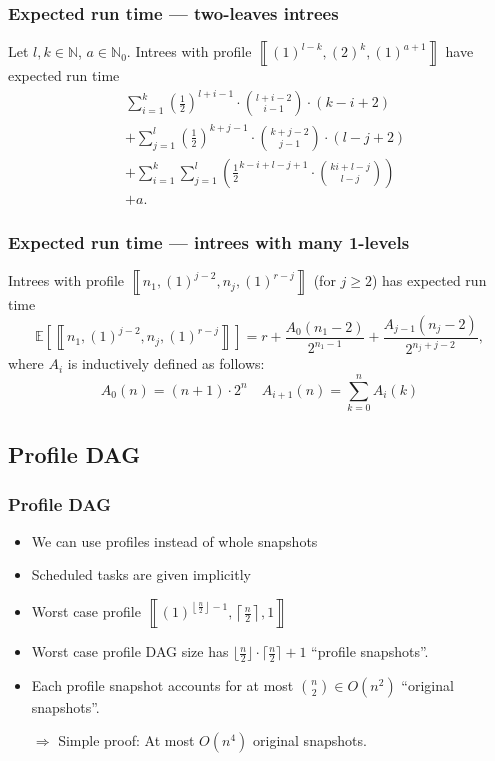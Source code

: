 \documentclass{beamer}
\newcommand{\profile}[1]{\left\llbracket #1 \right\rrbracket}
\newcommand{\profilerepeat}[2]{{(#1)}^{#2}}
\newcommand{\profileones}[1]{\profilerepeat{1}{#1}}
\newcommand{\E}[1]{\mathbb{E}\left[ #1 \right]}
\newcommand{\naturals}{\mathbb{N}}
\newcommand{\todo}[1]{ {\color{red}{#1} }}
\begin{document}
\begin{frame}
  \frametitle{Expected run time --- two-leaves intrees}
  \begin{theorem}[Moritz Maaß\todo{Wie zitieren?}]
    Let $l, k\in\naturals$, $a\in\naturals_0$. Intrees with profile $\profile{\profilerepeat{1}{l-k}, \profilerepeat{2}{k}, \profilerepeat{1}{a+1}}$ have expected run time
    \begin{align*}
      & \sum_{i=1}^k \left(\frac{1}{2}\right)^{l+i-1} \cdot \binom{l+i-2}{i-1} \cdot \left( k-i+2 \right) \\
       & + \sum_{j=1}^l \left(\frac{1}{2}\right)^{k+j-1} \cdot \binom{k+j-2}{j-1} \cdot \left( l-j+2 \right) \\
       & + \sum_{i=1}^k \sum_{j=1}^l \left( \frac{1}{2}^{k-i+l-j+1}\cdot\binom{ki+l-j}{l-j} \right) \\
       & + a
      .
    \end{align*}
  \end{theorem}
\end{frame}

\begin{frame}
  \frametitle{Expected run time --- intrees with many 1-levels}
  \begin{theorem}
    Intrees with profile $\profile{n_1,\profileones{j-2},n_j,\profileones{r-j}}$ (for $j\geq 2$) has expected run time
    \begin{equation*}
      \E{\profile{n_1,\profileones{j-2},n_j,\profileones{r-j}}} = 
      r + \frac{A_0(n_1-2)}{2^{n_1-1}} + \frac{A_{j-1}(n_j-2)}{2^{n_j+j-2}},
    \end{equation*}
    where $A_i$ is inductively defined as follows:
    \begin{equation*}
      A_0(n) = (n+1) \cdot 2^n \quad 
      A_{i+1}(n) = \sum_{k=0}^n A_{i}(k)
    \end{equation*}
  \end{theorem}
\end{frame}

\subsection{Profile DAG}

\begin{frame}
  \frametitle{Profile DAG}
  \begin{itemize}
  \item We can use profiles instead of whole snapshots
  \item Scheduled tasks are given implicitly
  \item Worst case profile $\profile{ \profileones{ \left\lfloor\frac{n}{2} \right\rfloor - 1}, \left\lceil \frac{n}{2} \right\rceil, 1 }$
  \item Worst case profile DAG size has $\lfloor \frac{n}{2} \rfloor \cdot \lceil \frac{n}{2} \rceil +1$ ``profile snapshots''.
  \item Each profile snapshot accounts for at most $\binom{n}{2}\in O(n^2)$ ``original snapshots''.
    
    $\Rightarrow$ Simple proof: At most $O(n^4)$ original snapshots.
  \end{itemize}
\end{frame}
\end{document}
